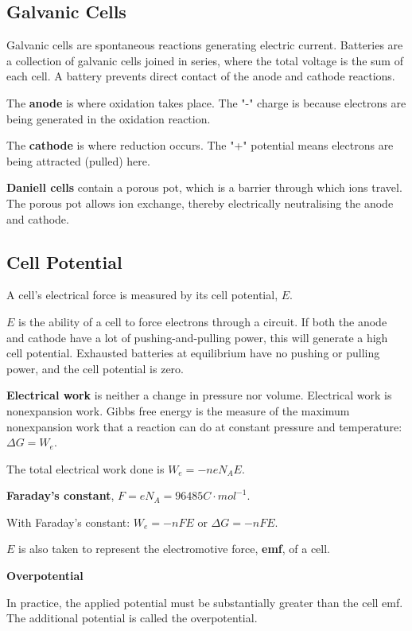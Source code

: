 \documentclass[a4paper,12pt]{article}
\begin{document}
\subsection{Galvanic Cells}
Galvanic cells are spontaneous reactions generating electric current.
Batteries are a collection of galvanic cells joined in series, where the total voltage is the sum of each cell.
A battery prevents direct contact of the anode and cathode reactions.\par
The \textbf{anode} is where oxidation takes place. The "-" charge is because electrons are being generated in the oxidation reaction.\par 
The \textbf{cathode} is where reduction occurs. The "+" potential means electrons are being attracted (pulled) here.\par
\textbf{Daniell cells} contain a porous pot, which is a barrier through which ions travel.
The porous pot allows ion exchange, thereby electrically neutralising the anode and cathode.
\subsection{Cell Potential}
A cell’s electrical force is measured by its cell potential, $E$.\par
$E$ is the ability of a cell to force electrons through a circuit. If both the anode and cathode have a lot of pushing-and-pulling power, this will generate a high cell potential. Exhausted batteries at equilibrium have no pushing or pulling power, and the cell potential is zero.\par
\textbf{Electrical work} is neither a change in pressure nor volume. Electrical work is nonexpansion work. Gibbs free energy is the measure of the maximum nonexpansion work that a reaction can do at constant pressure and temperature: $\Delta G=W_{e}$.\par
The total electrical work done is $W_{e} = -neN_{A}E$.\par
\textbf{Faraday’s constant}, $F=eN_{A}=96485 C\cdot mol^{-1}$.\par
With Faraday’s constant: $W_{e} = -nFE$ or $\Delta G = -nFE$.\par
$E$ is also taken to represent the electromotive force, \textbf{emf}, of a cell.\par
\textbf{Overpotential}\par
In practice, the applied potential must be substantially greater than the cell emf. The additional potential is called the overpotential.
\end{document}
